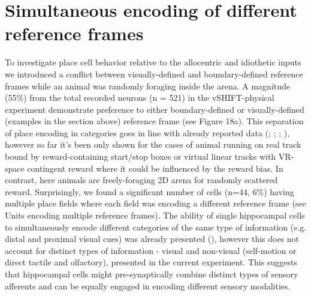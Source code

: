 \section{Simultaneous encoding of different reference frames}
\label{sec:integration_of_sm_imputs}

To investigate place cell behavior relative to the allocentric and idiothetic inputs we introduced a conflict between visually-defined and boundary-defined reference frames while an animal was randomly foraging inside the arena. A magnitude (55\%) from the total recorded neurons (n = 521) in the vSHIFT-physical experiment demonstrate preference to either boundary-defined or visually-defined (examples in the section above) reference frame (see Figure 18a). This separation of place encoding in categories goes in line with already reported data (\cite{Mcnaughton1996}; \cite{Aronov2014}; \cite{Chen2013}; \cite{Haas2019}), however so far it’s been only shown for the cases of animal running on real track bound by reward-containing start/stop boxes or virtual linear tracks with VR-space contingent reward where it could be influenced by the reward bias. In contrast, here animals are freely-foraging  2D arena  for randomly scattered reward. Surprisingly, we found a significant number of cells (n=44, 6\%) having multiple place fields where each field was encoding a different reference frame (see Units encoding multiple reference frames). The ability of single hippocampal cells to simultaneously encode different categories of the same type of information (e.g. distal and proximal visual cues) was already presented (\cite{Knierim2002}), however this does not account for distinct types of information - visual and non-visual (self-motion or direct tactile and olfactory), presented in the current experiment. This suggests that hippocampal cells might pre-synaptically combine distinct types of sensory afferents and can be equally engaged in encoding different sensory modalities.

